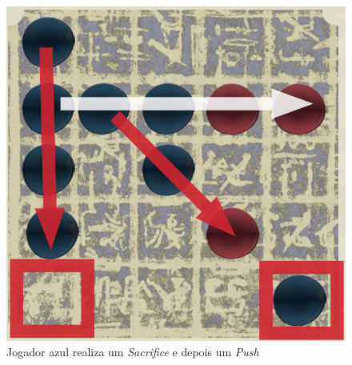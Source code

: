 \documentclass[a4paper]{article}
\begin{document}
\begin{figure}[!htb]
	\centering
	\includegraphics[scale=0.3]{push2.png} 
	\caption{Jogador azul realiza um \textit{Sacrifice} e depois um \textit{Push}}
\end{figure}

\newpage
\end{document}
